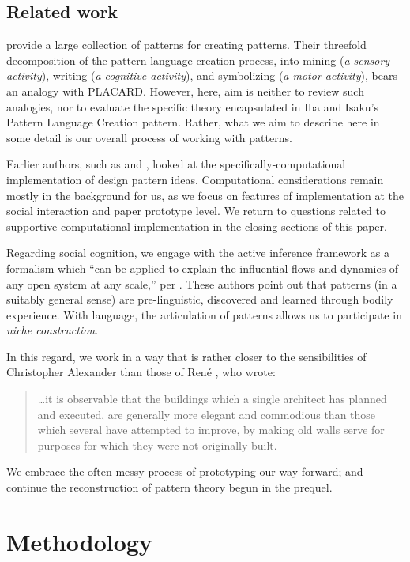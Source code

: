 \documentclass[acmlarge,timestamp]{acmart}
\DeclareRobustCommand{\scitshape}{\fontshape{\scitdefault}\selectfont}
\begin{document}
\subsection{Related work}
\citet{iba2016pattern} provide a large collection of patterns for
creating patterns.  Their threefold decomposition of the pattern
language creation process, into mining (\emph{a sensory activity}),
writing (\emph{a cognitive activity}), and symbolizing (\emph{a motor
activity}), bears an analogy with PLACARD.  However, here, aim is
neither to review such analogies, nor to evaluate the specific theory
encapsulated in Iba and Isaku’s {\scitshape Pattern Language Creation}
pattern.  Rather, what we aim to describe here in some detail is our
overall process of working with patterns.

Earlier authors, such as \citet{moran1971a} and \citet{OXMAN1994141},
looked at the specifically-computational implementation of design
pattern ideas.  Computational considerations remain mostly in the
background for us, as we focus on features of implementation at the
social interaction and paper prototype level.  We return to questions
related to supportive computational implementation in the closing
sections of this paper.

Regarding social cognition, we engage with the active inference
framework as a formalism which “can be applied to explain the
influential flows and dynamics of any open system at any scale,” per
\citet{Hiplito2022}.  These authors point out that patterns (in a
suitably general sense) are pre-linguistic, discovered and learned
through bodily experience.  With language, the articulation of
patterns allows us to participate in \emph{niche construction}.

In this regard, we work in a way that is rather closer to the
sensibilities of Christopher Alexander than those of Ren\'e
\citet{descartes1850discourse}, who wrote:
\begin{quote}
\ldots it is observable that the buildings which a single architect
has planned and executed, are generally more elegant and commodious
than those which several have attempted to improve, by making old
walls serve for purposes for which they were not originally built.
\end{quote}
We embrace the often messy process of prototyping our way forward; and
continue the reconstruction of pattern theory begun in the prequel.

\section{Methodology}
\label{sec:org134acbb}
\label{methods}
\end{document}

